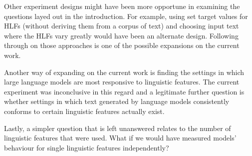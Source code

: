 \documentclass[runningheads,a4paper,11pt]{article}
\begin{document}
Other experiment designs might have been more opportune in examining the
questions layed out in the introduction.
For example, using set target values for HLFs (without deriving them from a
corpus of text) and choosing input text where the HLFs vary greatly would have
been an alternate design.
Following through on those approaches is one of the possible expansions on the
current work.

Another way of expanding on the current work is finding the settings in which
large language models are most responsive to linguistic features.
The current experiment was inconclusive in this regard and a legitimate further
question is whether settings in which text generated by language models
consistently conforms to certain linguistic features actually exist.

Lastly, a simpler question that is left unanswered relates to the number of
linguistic features that were used.
What if we would have measured models' behaviour for single linguistic features
independently?




\end{document}
